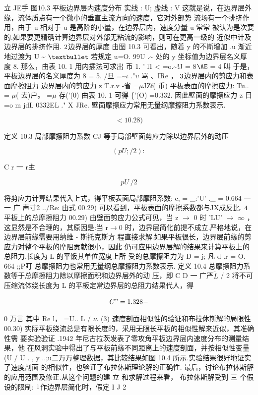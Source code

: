 立 JE手 图10.3 平板边界层内速度分布 实线 : U; 虚线 : V 这就是说，在边界层外缘，流体质点有一个微小的垂直主流方向的速度，它对外部势 流场有一个排挤作用，由于 u 相对于 u 是高阶的小量，在边界层内，速度分量 u 常常 被认为是次要的.如果要更精确计算边界层对外部无粘流的影响，则可在更高一级的 近似中计及边界层的排挤作用. ${\rm 2}$边界层的厚度 由图 10.3 可看出，随着 y 的不断增加 .u 渐近地过渡为 U \textasciitilde{} ${\rm •}$ 若规定 u=O. 99U .\textasciitilde{} 处的 y 坐标值为边界层名义厚度 8. 那么，由表 10. 1 用内插法可求出 币 1. ' l1 < =o.\textasciitilde{}!J = 8${\rm Æ}$ = 4 叫 于是，平板边界层的名义厚度为 8 = 5. /旦 =\textasciitilde{}$\iota$ ."$\upsilon$ 骂 、IRe ， ${\rm 3}$边界层内的剪应力和表面摩擦阻力 边界层内的剪应力 z T.r.v -省 =$\mu$JZf( 币) 平板表面的摩擦应力: Tu.. = $\mu$( 去)户。 =$\mu$ 存('(0) 由表 10. 1 可得 \{'(O) =0.332. 因此壁面的摩擦应力 z 日 =o m jdL 0332EL ." X JRe. 壁面摩擦应力常用无量纲摩擦阻力系数表示.

\[<10.28)\]

定义 10.3 局部摩擦阻力系数 CJ 等于局部壁面剪应力除以边界层外的动压

\[(pU; /2) :\]

C r 一 r主

\[pU~/ 2\]

将剪应力计算结果代入上式，得平板表面局部摩阻系数: c, = \_:'U' .\_ = 0.664 一 一 广 声寸2 ../Re: 由式 00.29) 可以看到，平板表面的摩擦系数都与JX成反比. ${\rm 4}$平板上的总摩擦阻力 00.29) 由壁面剪应力公式可见，当 z $\rightarrow$ 0 时 'LU' $\rightarrow$ $\infty$ ，这显然是不合理的，其原因是:当 r$\rightarrow$0 时，边界层简化前提不成立.严格地说，在边界层前缘需要用纳维 - 斯托克斯方 程直接求解.如果平板很长，边界层前缘的剪应力对整个平板的摩阻贡献很小，因此 仍可应用边界层解的结果来计算平板上的总阻力.长度为 L 的平饭其单位宽度上所 受的总摩擦阻力为 D = j; 凡 d .r = O. 664 ;;P盯 总摩擦阻力也常用无量纲总摩擦阻力系数表示. 定义 10.4 总摩擦阻力系数等于总摩擦阻力除以摩擦面积和边界层外的动 压，即 C D 一 广严$\tilde{L}$ / 2 将不可压缩流体绕长度为 L 的平板定常边界层的总阻力结果代人，得

\[C" = 1. 328 -\]

0 万言 其中 Re l， =U.. L / $\nu$. (3) 速度剖面相似性的验证和布拉休斯解的局限性 00.30) 实际平板绕流总是有限长度的，采用无限长平板的相似性解来近似，其准确性需 要实验验证 .1942 年尼古拉茨发表了零攻角平板边界层内速度分布的测量结果，他 在风洞实验中得出了与平板前缘不同距离上的速度剖面，并按相似性变量 (U / U . , y ..;u二万万整理数据，其比较结果如图 10.4 所示.实验结果很好地证实了速度剖面 的相似性，也验证了布拉休斯理论解的正确性. 最后，讨论布拉休斯解的应用范围及修正.从这个问题的建 立 和求解过程来看， 布拉休斯解受到 三 个假设的限制: ${\rm 1}$作边界层简化时，假定 I J 2

